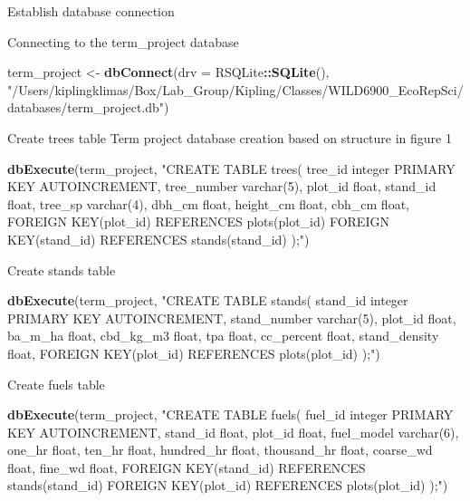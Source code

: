 \documentclass[]{book}
\newenvironment{Shaded}{\begin{snugshade}}{\end{snugshade}}
\newcommand{\DataTypeTok}[1]{\textcolor[rgb]{0.13,0.29,0.53}{#1}}
\newcommand{\KeywordTok}[1]{\textcolor[rgb]{0.13,0.29,0.53}{\textbf{#1}}}
\newcommand{\NormalTok}[1]{#1}
\newcommand{\OperatorTok}[1]{\textcolor[rgb]{0.81,0.36,0.00}{\textbf{#1}}}
\newcommand{\StringTok}[1]{\textcolor[rgb]{0.31,0.60,0.02}{#1}}
\begin{document}
Establish database connection

Connecting to the term\_project database

\begin{Shaded}
\begin{Highlighting}[]
\NormalTok{term_project <-}\StringTok{ }\KeywordTok{dbConnect}\NormalTok{(}\DataTypeTok{drv =}\NormalTok{ RSQLite}\OperatorTok{::}\KeywordTok{SQLite}\NormalTok{(),}
                        \StringTok{"/Users/kiplingklimas/Box/Lab_Group/Kipling/Classes/WILD6900_EcoRepSci/databases/term_project.db"}\NormalTok{)}
\end{Highlighting}
\end{Shaded}

Create trees table
Term project database creation based on structure in figure 1

\begin{Shaded}
\begin{Highlighting}[]
\KeywordTok{dbExecute}\NormalTok{(term_project, }\StringTok{"CREATE TABLE trees(}
\StringTok{tree_id integer PRIMARY KEY AUTOINCREMENT,}
\StringTok{tree_number varchar(5),}
\StringTok{plot_id float,}
\StringTok{stand_id float,}
\StringTok{tree_sp varchar(4),}
\StringTok{dbh_cm float,}
\StringTok{height_cm float, }
\StringTok{cbh_cm float,}
\StringTok{FOREIGN KEY(plot_id) REFERENCES plots(plot_id)}
\StringTok{FOREIGN KEY(stand_id) REFERENCES stands(stand_id)}
\StringTok{);"}\NormalTok{)}
\end{Highlighting}
\end{Shaded}

Create stands table

\begin{Shaded}
\begin{Highlighting}[]
\KeywordTok{dbExecute}\NormalTok{(term_project, }\StringTok{"CREATE TABLE stands(}
\StringTok{stand_id integer PRIMARY KEY AUTOINCREMENT,}
\StringTok{stand_number varchar(5),}
\StringTok{plot_id float,}
\StringTok{ba_m_ha float,}
\StringTok{cbd_kg_m3 float,}
\StringTok{tpa float,}
\StringTok{cc_percent float,}
\StringTok{stand_density float, }
\StringTok{FOREIGN KEY(plot_id) REFERENCES plots(plot_id)}
\StringTok{);"}\NormalTok{)}
\end{Highlighting}
\end{Shaded}

Create fuels table

\begin{Shaded}
\begin{Highlighting}[]
\KeywordTok{dbExecute}\NormalTok{(term_project, }\StringTok{"CREATE TABLE fuels(}
\StringTok{fuel_id integer PRIMARY KEY AUTOINCREMENT,}
\StringTok{stand_id float,}
\StringTok{plot_id float,}
\StringTok{fuel_model varchar(6),}
\StringTok{one_hr float,}
\StringTok{ten_hr float,}
\StringTok{hundred_hr float,}
\StringTok{thousand_hr float,}
\StringTok{coarse_wd float,}
\StringTok{fine_wd float,}
\StringTok{FOREIGN KEY(stand_id) REFERENCES stands(stand_id)}
\StringTok{FOREIGN KEY(plot_id) REFERENCES plots(plot_id)}
\StringTok{);"}\NormalTok{)}
\end{Highlighting}
\end{Shaded}
\end{document}
